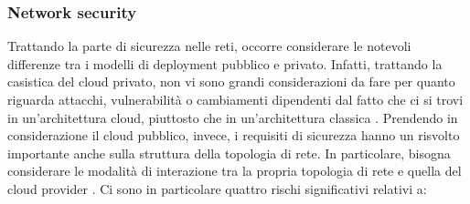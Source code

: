 \documentclass[../main.tex]{subfiles}
\begin{document}
\subsubsection{Network security}
Trattando la parte di sicurezza nelle reti, occorre considerare le notevoli differenze tra i modelli di deployment pubblico e privato.  
Infatti, trattando la casistica del cloud privato, non vi sono grandi considerazioni da fare per quanto riguarda attacchi, vulnerabilità o cambiamenti dipendenti dal fatto che ci si trovi in un'architettura cloud, piuttosto che in un'architettura classica \cite{CloudSecurityBook}.
Prendendo in considerazione il cloud pubblico, invece, i requisiti di sicurezza hanno un risvolto importante anche sulla struttura della topologia di rete. In particolare, bisogna considerare le modalità di interazione tra la propria topologia di rete e quella del cloud provider \cite{CloudSecurityBook}. Ci sono in particolare quattro rischi significativi relativi a:
\end{document}
